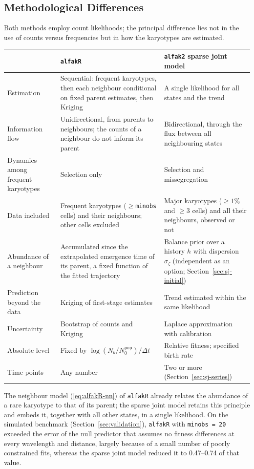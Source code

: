 \documentclass[11pt]{article}
\begin{document}
\subsection{Methodological Differences}

Both methods employ count likelihoods; the principal difference lies not in
the use of counts versus frequencies but in how the karyotypes are estimated.

\begin{center}
\begin{tabular}{L{0.2\textwidth}L{0.35\textwidth}L{0.35\textwidth}}
\toprule
 & \texttt{alfakR} & \texttt{alfak2} sparse joint model \\
\midrule
Estimation & Sequential: frequent karyotypes, then each neighbour
conditional on fixed parent estimates, then Kriging & A single likelihood for
all states and the trend \\
Information flow & Unidirectional, from parents to neighbours; the counts of a
neighbour do not inform its parent & Bidirectional, through the flux between
all neighbouring states \\
Dynamics among frequent karyotypes & Selection only & Selection and
missegregation \\
Data included & Frequent karyotypes ($\ge$\texttt{minobs} cells) and their
neighbours; other cells excluded & Major karyotypes ($\ge1\%$ and $\ge3$
cells) and all their neighbours, observed or not \\
Abundance of a neighbour & Accumulated since the extrapolated emergence time
of its parent, a fixed function of the fitted trajectory & Balance prior over
a history $h$ with dispersion $\sigma_\zeta$ (independent as an option;
Section~\ref{sec:sj-initial}) \\
Prediction beyond the data & Kriging of first-stage estimates & Trend
estimated within the same likelihood \\
Uncertainty & Bootstrap of counts and Kriging & Laplace approximation with
calibration \\
Absolute level & Fixed by $\log(N_b/N_0^{\mathrm{pop}})/\Delta t$ & Relative
fitness; specified birth rate \\
Time points & Any number & Two or more (Section~\ref{sec:sj-series}) \\
\bottomrule
\end{tabular}
\end{center}

The neighbour model (\ref{eq:alfakR-nn}) of \texttt{alfakR} already relates
the abundance of a rare karyotype to that of its parent; the sparse joint
model retains this principle and embeds it, together with all other states,
in a single likelihood. On the simulated benchmark (Section~\ref{sec:validation}),
\texttt{alfakR} with \texttt{minobs = 20} exceeded the error of the null
predictor that assumes no fitness differences at every wavelength and
distance, largely because of a small number of poorly constrained fits,
whereas the sparse joint model reduced it to 0.47--0.74 of that value.
\end{document}
